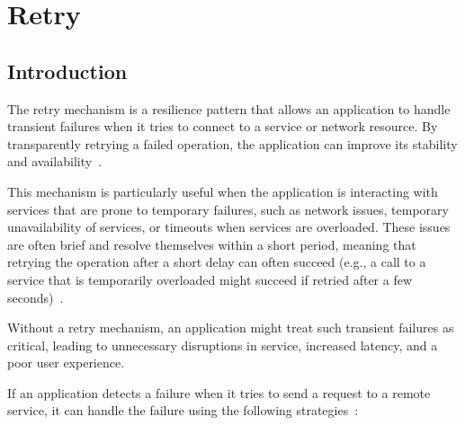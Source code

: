 \chapter{Retry}\label{ch:retry}


\section{Introduction}\label{sec:retry-context}

The retry mechanism is a resilience pattern that allows an application to handle transient failures when it tries to connect to a service or network resource.
By transparently retrying a failed operation, the application can improve its stability and availability~\cite{microsoft-retry-pattern}.

This mechanism is particularly useful when the application is interacting with services that are prone to temporary failures, such as network issues, temporary unavailability of services, or timeouts when services are overloaded.
These issues are often brief and resolve themselves within a short period, meaning that retrying the operation after a short delay can often succeed (e.g., a call to a service that is temporarily overloaded might succeed if retried after a few seconds)~\cite{microsoft-retry-pattern}.

Without a retry mechanism, an application might treat such transient failures as critical, leading to unnecessary disruptions in service, increased latency, and a poor user experience.

If an application detects a failure when it tries to send a request to a remote service, it can handle the failure using the following strategies~\cite{microsoft-retry-pattern}:

